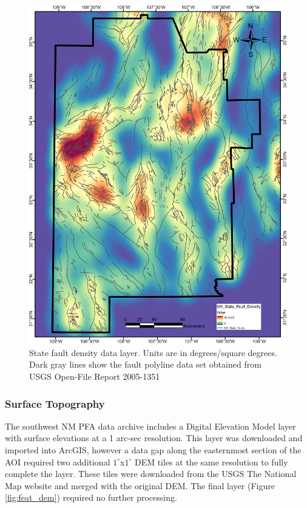 \begin{figure}[!htp]
\centering
\includegraphics[scale=.50]{templates/images/Figure-StateFaultDensity.png}
\caption[State fault density data layer]{State fault density data layer. Units are in degrees/square degrees. Dark gray lines show the fault polyline data set obtained from USGS Open-File Report 2005-1351 \protect\citep{stoeser_new_2005}}
\label{fig:state_faults}
\end{figure}

\subsubsection{Surface Topography}

The southwest NM PFA data archive \citep{kelley_geothermal_2015} includes a Digital Elevation Model layer with surface elevations at a 1 arc-sec resolution. This layer was downloaded and imported into ArcGIS, however a data gap along the easternmost section of the AOI required two additional $1^\circ$x$1^\circ$ DEM tiles at the same resolution to fully complete the layer. These tiles were downloaded from the USGS The National Map website \citep{usgs_tnm_2021} and merged with the original DEM. The final layer (Figure \ref{fig:feat_dem}) required no further processing.

